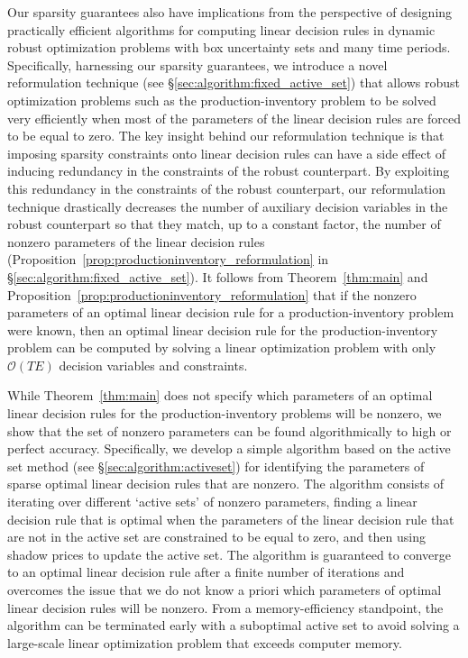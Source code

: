 \documentclass[nonblindrev,mnsc]{informs3} %
\begin{document}
Our sparsity guarantees also have  implications from the perspective of designing practically efficient algorithms for computing linear decision rules in dynamic robust optimization problems with box uncertainty sets and many time periods. 
Specifically, harnessing our sparsity guarantees,  we  introduce a novel  reformulation technique  (see \S\ref{sec:algorithm:fixed_active_set}) that allows robust optimization problems such as the production-inventory problem to be solved very efficiently when most of the parameters of the linear decision rules are forced to be equal to zero. The key insight behind our  reformulation technique is that imposing sparsity constraints onto linear decision rules can have a side effect of inducing redundancy in the constraints of the robust counterpart. By exploiting this redundancy in the constraints of the robust counterpart, our reformulation technique drastically decreases the number of auxiliary decision variables in the robust counterpart so that they match, up to  a constant factor,  the number of nonzero parameters of the linear decision rules (Proposition~\ref{prop:productioninventory_reformulation} in \S\ref{sec:algorithm:fixed_active_set}). It follows from Theorem~\ref{thm:main} and Proposition~\ref{prop:productioninventory_reformulation} that if the nonzero parameters of an optimal linear decision rule for a production-inventory problem were {known}, then an optimal linear decision rule for the production-inventory problem can be computed by solving a linear optimization problem with only $\mathcal{O}(TE)$ decision variables and constraints.


While Theorem~\ref{thm:main} does not specify which parameters of an optimal linear decision rules for the production-inventory problems will be nonzero, we show  that the set of nonzero parameters can be found {algorithmically} to high or perfect accuracy. 
Specifically, we develop a simple algorithm based on the active set method (see \S\ref{sec:algorithm:activeset}) for identifying the parameters of sparse optimal linear decision rules that are nonzero. 
The algorithm consists of iterating
over different ‘active sets’ of nonzero parameters, finding a linear decision rule that is
optimal when the parameters of the linear decision rule that are not in the active set
are constrained to be equal to zero, and then using shadow prices to update the active
set. The algorithm is guaranteed to converge to an optimal linear decision rule after a finite number of
iterations and overcomes the issue that we do not know a priori which parameters of optimal linear decision rules will be nonzero. From a memory-efficiency standpoint, the algorithm can be terminated early with a suboptimal active set to avoid solving a large-scale linear optimization problem that exceeds computer memory. 
\end{document}
